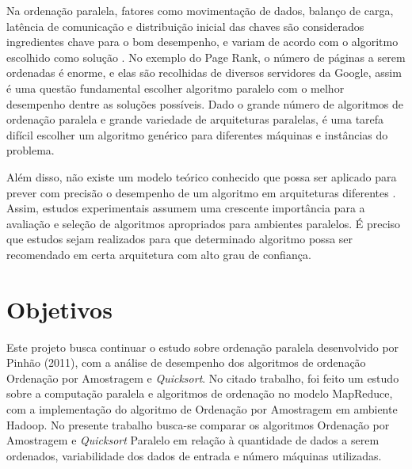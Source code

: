 


Na ordenação paralela, fatores como movimentação de dados, balanço de carga, latência de comunicação e distribuição inicial das chaves são considerados ingredientes chave para o bom desempenho, e variam de acordo com o algoritmo escolhido como solução \cite{Kale:2010}.  No exemplo do Page Rank, o número de páginas a serem ordenadas é enorme, e elas são recolhidas de diversos servidores da Google, assim é uma questão fundamental escolher algoritmo paralelo com o melhor desempenho dentre as soluções possíveis.
Dado o grande número de algoritmos de ordenação paralela e grande variedade de arquiteturas paralelas, é uma tarefa difícil escolher um algoritmo genérico para diferentes máquinas e instâncias do problema.

 Além disso, não existe um modelo teórico conhecido que possa ser aplicado para prever com precisão o desempenho de um algoritmo em arquiteturas diferentes \cite{Amato:1996}.
Assim, estudos experimentais assumem uma crescente importância para a avaliação e seleção de algoritmos apropriados para ambientes paralelos. É preciso que estudos sejam realizados para que determinado algoritmo possa ser recomendado em certa arquitetura com alto grau de confiança.

\section{Objetivos}


Este projeto busca continuar o estudo sobre ordenação paralela desenvolvido por Pinhão (2011), com a análise de desempenho dos algoritmos de ordenação Ordenação por Amostragem e \textit{Quicksort}. No citado trabalho, foi feito um estudo sobre a computação paralela e algoritmos de ordenação no modelo MapReduce, com a implementação do algoritmo de Ordenação por Amostragem em ambiente Hadoop. 
No presente trabalho busca-se comparar os algoritmos Ordenação por Amostragem e \textit{Quicksort} Paralelo em relação à quantidade de dados a serem ordenados, variabilidade dos dados de entrada e número máquinas utilizadas. 

